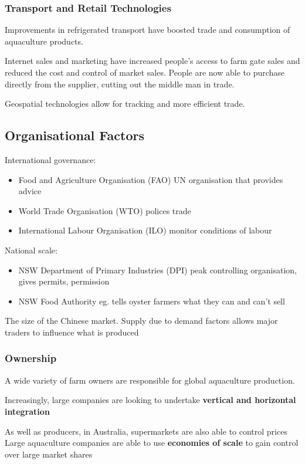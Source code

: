 			\subsubsection{Transport and Retail Technologies}
				Improvements in refrigerated transport have boosted trade and consumption of aquaculture products.

				Internet sales and marketing have increased people's access to farm gate sales and reduced the cost and control of market sales. People are now able to purchase directly from the supplier, cutting out the middle man in trade.

				Geospatial technologies allow for tracking and more efficient trade.

		\subsection{Organisational Factors}
			International governance:
			\begin{itemize}
				\item Food and Agriculture Organisation (FAO) UN organisation that provides advice
				\item World Trade Organisation (WTO) polices trade
				\item International Labour Organisation (ILO) monitor conditions of labour
			\end{itemize}

			National scale:
			\begin{itemize}
				\item NSW Department of Primary Industries (DPI) peak controlling organisation, gives permits, permission
				\item NSW Food Authority eg. tells oyster farmers what they can and can't sell
			\end{itemize}

			The size of the Chinese market. Supply due to demand factors allows major traders to influence what is produced

			\subsubsection{Ownership}
				A wide variety of farm owners are responsible for global aquaculture production.

				Increasingly, large companies are looking to undertake \textbf{vertical and horizontal integration}
				
				As well as producers, in Australia, supermarkets are also able to control prices 
				Large aquaculture companies are able to use \textbf{economies of scale} to gain control over large market shares

